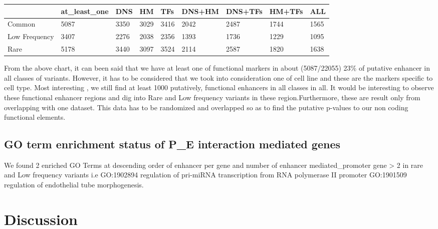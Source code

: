 \documentclass[11pt]{article} %
\begin{document}
\begin{table}[H]
\centering
\label{my-label}
\begin{tabular}{@{}lllllllll@{}}
\toprule
\rowcolor[HTML]{BBDAFF} 
\multicolumn{1}{c}{\cellcolor[HTML]{BBDAFF}{\color[HTML]{333333} class}} & {\color[HTML]{333333} at\_least\_one} & {\color[HTML]{333333} DNS} & {\color[HTML]{333333} HM} & {\color[HTML]{333333} TFs} & {\color[HTML]{333333} DNS+HM} & {\color[HTML]{333333} DNS+TFs} & {\color[HTML]{333333} HM+TFs} & {\color[HTML]{333333} ALL} \\ \midrule
\cellcolor[HTML]{FFFFFF}Common & 5087 & 3350 & 3029 & 3416 & 2042 & 2487 & 1744 & 1565 \\
\cellcolor[HTML]{FFFFFF}Low Frequency & 3407 & 2276 & 2038 & 2356 & 1393 & 1736 & 1229 & 1095 \\
\cellcolor[HTML]{FFFFFF}Rare & 5178 & 3440 & 3097 & 3524 & 2114 & 2587 & 1820 & 1638 \\ \bottomrule
\end{tabular}
\end{table}

From the above chart, it can been said that we have at least one of functional markers in about (5087/22055) 23\% of putative enhancer in all classes of variants. However, it has to be considered that we took into consideration one of cell line and these are the markers specific to cell type. Most interesting , we still find at least 1000 putatively, functional enhancers in all classes in all. It would be interesting to observe these functional enhancer regions and dig into Rare and Low frequency variants in these region.Furthermore, these are result only from overlapping with one dataset. This data has to be randomized and overlapped so as to find the putative p-values to our non coding functional elements.

\subsection{GO term enrichment status of P\_E interaction mediated genes}


We found 2 enriched GO Terms at descending order of enhancer per gene and number of enhancer mediated\_promoter gene \textgreater{} 2 in rare and Low frequency variants i.e GO:1902894 regulation of pri-miRNA
transcription from RNA polymerase II promoter GO:1901509 regulation of endothelial tube morphogenesis.

\section{Discussion}
\end{document}
